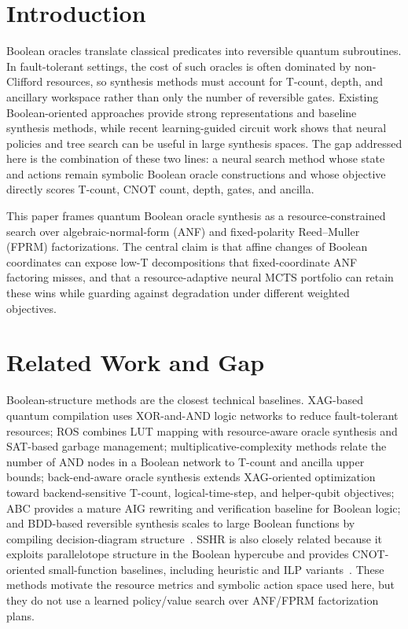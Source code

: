 \documentclass[11pt]{article}
\begin{document}
\section{Introduction}

Boolean oracles translate classical predicates into reversible quantum
subroutines.  In fault-tolerant settings, the cost of such oracles is often
dominated by non-Clifford resources, so synthesis methods must account for
T-count, depth, and ancillary workspace rather than only the number of reversible
gates.  Existing Boolean-oriented approaches provide strong representations and
baseline synthesis methods, while recent learning-guided circuit work shows
that neural policies and tree search can be useful in large synthesis spaces.
The gap addressed here is the combination of these two lines: a neural search
method whose state and actions remain symbolic Boolean oracle constructions and
whose objective directly scores T-count, CNOT count, depth, gates, and ancilla.

This paper frames quantum Boolean oracle synthesis as a resource-constrained
search over algebraic-normal-form (ANF) and fixed-polarity Reed--Muller (FPRM)
factorizations.  The central claim is that affine changes of Boolean coordinates
can expose low-T decompositions that fixed-coordinate ANF factoring misses, and
that a resource-adaptive neural MCTS portfolio can retain these wins while
guarding against degradation under different weighted objectives.

\section{Related Work and Gap}

Boolean-structure methods are the closest technical baselines.  XAG-based
quantum compilation uses XOR-and-AND logic networks to reduce fault-tolerant
resources; ROS combines LUT mapping with resource-aware oracle synthesis and
SAT-based garbage management; multiplicative-complexity methods relate the
number of AND nodes in a Boolean network to T-count and ancilla upper bounds;
back-end-aware oracle synthesis extends XAG-oriented optimization toward
backend-sensitive T-count, logical-time-step, and helper-qubit objectives;
ABC provides a mature AIG rewriting and verification baseline for Boolean logic;
and BDD-based reversible synthesis scales to large Boolean functions by
compiling decision-diagram
structure~\cite{meuli2022xag,meuli2020ros,meuli2019multiplicative,yu2025backend,brayton2010abc,wille2009bdd}.
SSHR is also closely related because it exploits parallelotope structure in the
Boolean hypercube and provides CNOT-oriented small-function baselines,
including heuristic and ILP variants~\cite{zheng2025sshr}.  These methods
motivate the resource metrics and symbolic action space used here, but they do
not use a learned policy/value search over ANF/FPRM factorization plans.
\end{document}
